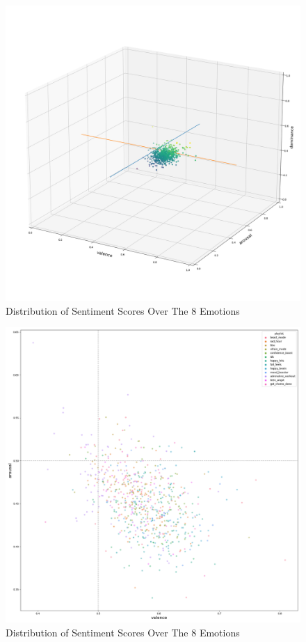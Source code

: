 \documentclass[11pt]{article}
\begin{document}
\begin{figure}[!ht]
  \includegraphics[scale=0.3]{../statics/plots/vad.png}
  \centering
  \caption{Distribution of Sentiment Scores Over The 8 Emotions}
  \label{fig:vad_points}
\end{figure}

\begin{figure}[!ht]
  \includegraphics[scale=0.3]{../statics/plots/va_playlist_False.png}
  \centering
  \caption{Distribution of Sentiment Scores Over The 8 Emotions}
  \label{fig:va_points}
\end{figure}
\end{document}
